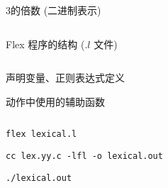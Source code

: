 \begin{frame}{}
  \begin{columns}
      \pause
      \begin{center}
        3的倍数 (二进制表示)
      \end{center}
  \end{columns}
\end{frame}

\begin{frame}{}
  \begin{center}
    Flex 程序的结构 ($.l$ 文件)
  \end{center}

  \begin{columns}
      \begin{description}
        \setlength{\itemsep}{12pt}
        \item[声明部分:] 声明变量、正则表达式定义
        \item[转换规则:] 
        \item[辅助函数:] 动作中使用的辅助函数
      \end{description}
  \end{columns}
\end{frame}


\begin{frame}{}
\end{frame}

\begin{frame}{}
  \begin{center}
    \texttt{flex lexical.l}

    \vspace{0.80cm}
    \texttt{cc lex.yy.c -lfl -o lexical.out}

    \vspace{0.80cm}
    \texttt{./lexical.out}
  \end{center}
\end{frame}


